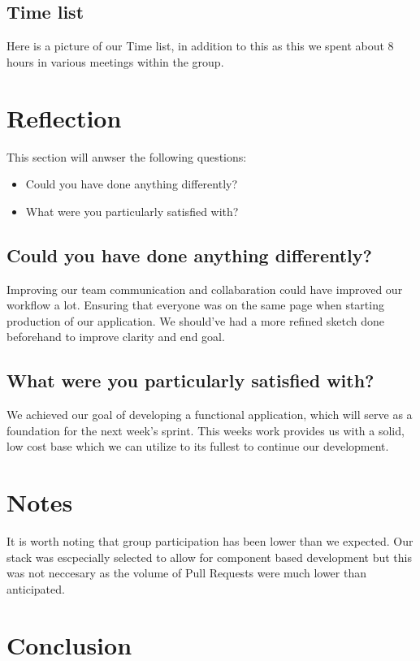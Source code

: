 \documentclass[12pt]{article}
\begin{document}
\subsection{Time list}

Here is a picture of our Time list, in addition to this as this we spent about 8 hours in various meetings within the group.

\section{Reflection}
This section will anwser the following questions:
\begin{itemize}
    \item Could you have done anything differently?
    \item What were you particularly satisfied with?
\end{itemize}

\subsection{Could you have done anything differently?}
Improving our team communication and collabaration could have improved our workflow a lot. Ensuring that everyone was on the 
same page when starting production of our application. We should've had a more refined sketch done beforehand to improve 
clarity and end goal.

\subsection{What were you particularly satisfied with?}
We achieved our goal of developing a functional application, which will serve as a foundation for the next week's sprint. 
This weeks work provides us with a solid, low cost base which we can utilize to its fullest to continue our development.

\section{Notes}
It is worth noting that group participation has been lower than we expected.
Our stack was escpecially selected to allow for component based development but this was not neccesary
as the volume of Pull Requests were much lower than anticipated.

\section{Conclusion}

\pagebreak
\printbibliography
\end{document}
